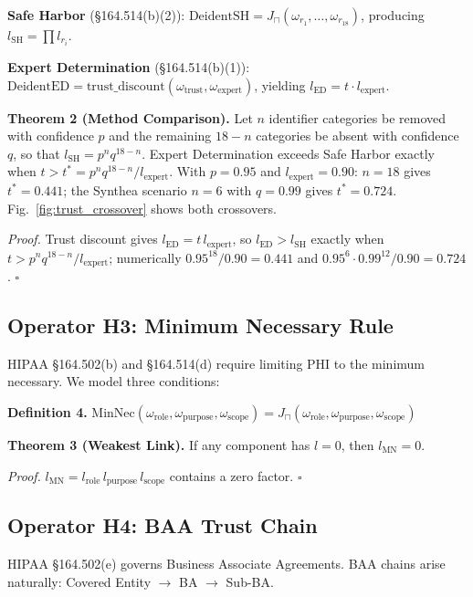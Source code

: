 \documentclass[conference]{IEEEtran}
\begin{document}
\textbf{Safe Harbor} (\S164.514(b)(2)): $\text{DeidentSH} = J_\sqcap(\omega_{r_1}, \ldots, \omega_{r_{18}})$, producing $l_{\text{SH}} = \prod l_{r_i}$.

\textbf{Expert Determination} (\S164.514(b)(1)):
$\text{DeidentED} = \text{trust\_discount}(\omega_{\text{trust}}, \omega_{\text{expert}})$, yielding $l_{\text{ED}} = t \cdot l_{\text{expert}}$.

\textbf{Theorem 2 (Method Comparison).} Let $n$ identifier categories be removed with confidence $p$ and the remaining $18-n$ categories be absent with confidence $q$, so that $l_{\text{SH}} = p^{n} q^{18-n}$. Expert Determination exceeds Safe Harbor exactly when $t > t^* = p^{n} q^{18-n}/l_{\text{expert}}$. With $p = 0.95$ and $l_{\text{expert}} = 0.90$: $n = 18$ gives $t^* = 0.441$; the Synthea scenario $n = 6$ with $q = 0.99$ gives $t^* = 0.724$. Fig.~\ref{fig:trust_crossover} shows both crossovers.

\emph{Proof.} Trust discount gives $l_{\text{ED}} = t \, l_{\text{expert}}$, so $l_{\text{ED}} > l_{\text{SH}}$ exactly when $t > p^{n} q^{18-n} / l_{\text{expert}}$; numerically $0.95^{18}/0.90 = 0.441$ and $0.95^{6} \cdot 0.99^{12} / 0.90 = 0.724$. $\square$



\subsection{Operator H3: Minimum Necessary Rule}

HIPAA \S164.502(b) and \S164.514(d) require limiting PHI to the minimum necessary. We model three conditions:

\textbf{Definition 4.} $\text{MinNec}(\omega_{\text{role}}, \omega_{\text{purpose}}, \omega_{\text{scope}}) = J_\sqcap(\omega_{\text{role}}, \omega_{\text{purpose}}, \omega_{\text{scope}})$

\textbf{Theorem 3 (Weakest Link).} If any component has $l = 0$, then $l_{\text{MN}} = 0$.

\emph{Proof.} $l_{\text{MN}} = l_{\text{role}} \, l_{\text{purpose}} \, l_{\text{scope}}$ contains a zero factor. $\square$

\subsection{Operator H4: BAA Trust Chain}

HIPAA \S164.502(e) governs Business Associate Agreements. BAA chains arise naturally: Covered Entity $\to$ BA $\to$ Sub-BA.
\end{document}
